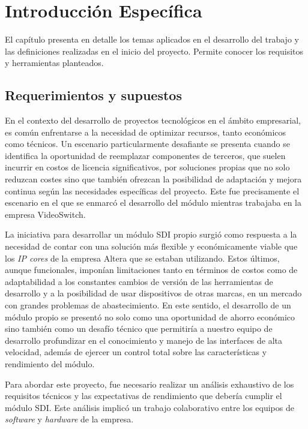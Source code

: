 \chapter{Introducción Específica}\label{Chapter2}

El capítulo presenta en detalle los temas aplicados en el desarrollo del trabajo y
las definiciones realizadas en el inicio del proyecto. Permite conocer los requisitos
y herramientas planteados.

\section{Requerimientos y supuestos}

  En el contexto del desarrollo de proyectos tecnológicos en el ámbito empresarial,
  es común enfrentarse a la necesidad de optimizar recursos, tanto económicos como
  técnicos. Un escenario particularmente desafiante se presenta cuando se
  identifica la oportunidad de reemplazar componentes de terceros, que suelen
  incurrir en costos de licencia significativos, por soluciones propias que no
  solo reduzcan costes sino que también ofrezcan la posibilidad de adaptación y
  mejora continua según las necesidades específicas del proyecto. Este fue
  precisamente el escenario en el que se enmarcó el desarrollo del módulo
  mientras trabajaba en la empresa VideoSwitch.

  La iniciativa para desarrollar un módulo SDI propio surgió como respuesta a la
  necesidad de contar con una solución más flexible y económicamente viable que
  los \textit{IP cores} de la empresa Altera que se estaban utilizando. Estos
  últimos, aunque funcionales, imponían limitaciones tanto en términos de costos
  como de adaptabilidad a los constantes cambios de versión de las herramientas
  de desarrollo y a la posibilidad de usar dispositivos de otras marcas, en un
  mercado con grandes problemas de abastecimiento. En este sentido, el desarrollo
  de un módulo propio se presentó no solo como una oportunidad de ahorro económico
  sino también como un desafío técnico que permitiría a nuestro equipo de
  desarrollo profundizar en el conocimiento y manejo de las interfaces de alta
  velocidad, además de ejercer un control total sobre las características y
  rendimiento del módulo.

  Para abordar este proyecto, fue necesario realizar un análisis exhaustivo de
  los requisitos técnicos y las expectativas de rendimiento que debería cumplir
  el módulo SDI\@. Este análisis implicó un trabajo colaborativo entre los
  equipos de \textit{software} y \textit{hardware} de la empresa.

